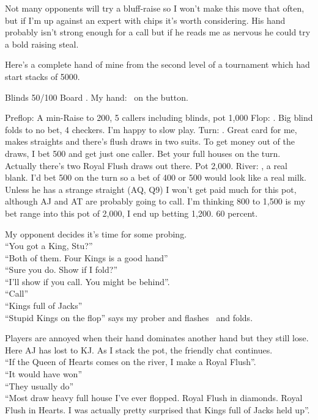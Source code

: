 Not many opponents will try a bluff-raise so I won't make this move
that often, but if I'm up against an expert with chips it's worth
considering. His hand probably isn't strong enough for a call but if he
reads me as nervous he could try a bold raising steal.

Here's a complete hand of mine from the second level
of a tournament which had start stacks of 5000.

Blinds 50/100 Board \Kd\Kh\Jd\tenh\tres. My hand: \Kc\Jc\ on the button.

Preflop: A min-Raise to 200, 5 callers including blinds, pot 1,000
Flop: \Kd\Kh\Jd. Big blind folds to no bet, 4 checkers. I'm happy to slow play.
Turn: \tenh. Great card for me, makes straights and there's flush
  draws in two suits. To get money out of the draws, I bet 500 and get
  just one caller. Bet your full houses on the turn. Actually there's
  two Royal Flush draws out there. Pot 2,000.
River: \tres, a real blank. I'd bet 500 on the turn so a bet of 400 or
  500 would look like a real milk. Unless he has a strange straight
  (AQ, Q9) I won't get paid much for this pot, although AJ and AT are
  probably going to call. I'm thinking 800 to 1,500 is my bet range
  into this pot of 2,000, I end up betting 1,200. 60 percent.

My opponent decides it's time for some probing.\\
``You got a King, Stu?'' \\
``Both of them. Four Kings is a good hand'' \\
``Sure you do. Show if I fold?'' \\
``I'll show if you call. You might be behind''. \\
``Call'' \\
``Kings full of Jacks'' \\
``Stupid Kings on the flop'' says my prober and flashes \Ah\Jh\ and folds.


Players are annoyed when their hand dominates another hand but they
still lose. Here AJ has lost to KJ. As I stack the pot, the friendly
chat continues. \\
``If the Queen of Hearts comes on the river, I make a Royal Flush''. \\
``It would have won'' \\
``They usually do'' \\
``Most draw heavy full house I've ever flopped. Royal Flush in diamonds.
Royal Flush in Hearts. I was actually pretty surprised that Kings
full of Jacks held up''.

